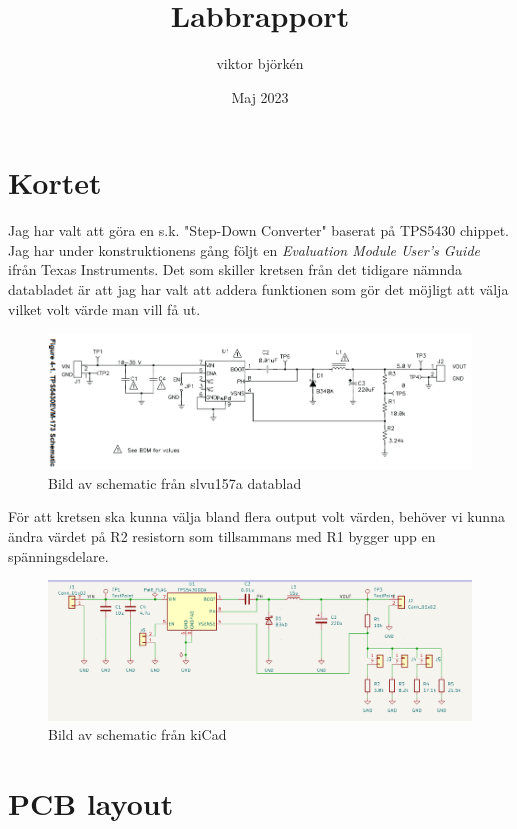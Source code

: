 \documentclass{article}
\title{Labbrapport}
\author{viktor björkén }
\date{Maj 2023}
\begin{document}
\maketitle

\section{Kortet}

Jag har valt att göra en s.k. "Step-Down Converter" baserat på TPS5430 chippet.
Jag har under konstruktionens gång följt en \textit{Evaluation Module User's
Guide} ifrån Texas Instruments. Det som skiller kretsen från det tidigare
nämnda databladet är att jag har valt att addera funktionen som gör det möjligt
att välja vilket volt värde man vill få ut. 

\begin{figure}[htp]
    \centering
    \includegraphics[width=15cm]{img/nyschema.png}
    \caption{Bild av schematic från slvu157a datablad}
\end{figure}

För att kretsen ska kunna välja bland flera output volt värden, behöver vi
kunna ändra värdet på R2 resistorn som tillsammans med R1 bygger upp en
spänningsdelare.

\begin{figure}[htp]
    \centering
    \includegraphics[width=15cm]{img/schemalab.png}
    \caption{Bild av schematic från kiCad}
\end{figure}

\section{PCB layout}
\end{document}
